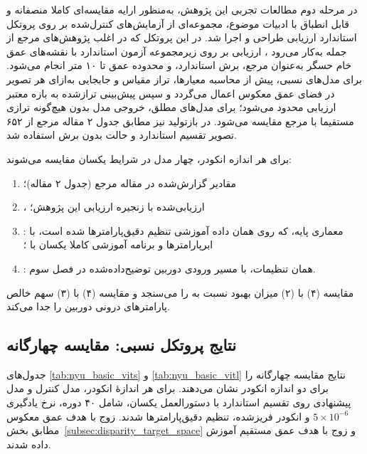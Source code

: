 در مرحله دوم مطالعات تجربی این پژوهش، به‌منظور ارایه مقایسه‌ای کاملا منصفانه و قابل انطباق با ادبیات موضوع، مجموعه‌ای از آزمایش‌های کنترل‌شده بر روی پروتکل استاندارد ارزیابی  طراحی و اجرا شد. در این پروتکل که در اغلب پژوهش‌های مرجع از جمله  به‌کار می‌رود \cite{Eigen2014Depth, DepthAnythingV2}، ارزیابی بر روی زیرمجموعه آزمون استاندارد با نقشه‌های عمق خام حسگر به‌عنوان مرجع، برش استاندارد، و محدوده عمق  تا ۱۰ متر انجام می‌شود. برای مدل‌های نسبی، پیش از محاسبه معیارها، تراز مقیاس و جابجایی به‌ازای هر تصویر در فضای عمق معکوس اعمال می‌گردد و سپس پیش‌بینی تراز‌شده به بازه معتبر ارزیابی محدود می‌شود؛ برای مدل‌های مطلق، خروجی مدل بدون هیچ‌گونه ترازی مستقیما با مرجع مقایسه می‌شود. در بازتولید  نیز مطابق جدول ۲ مقاله مرجع از ۶۵۲ تصویر تقسیم استاندارد و حالت بدون برش استفاده شد.

برای هر اندازه انکودر، چهار مدل در شرایط یکسان مقایسه می‌شوند:
\begin{enumerate}
  \item مقادیر گزارش‌شده در مقاله مرجع  (جدول ۲ مقاله)؛
  \item \publishedbasemodel{}، ارزیابی‌شده با زنجیره ارزیابی این پژوهش؛
  \item \controlmodel{}: معماری پایه، که روی همان داده آموزشی تنظیم دقیق‌پارامترها شده است، با ابرپارامترها و برنامه آموزشی کاملا یکسان با \proposedmodel{}؛
  \item \proposedmodel{}: همان تنظیمات، با مسیر ورودی دوربین توضیح‌داده‌شده در فصل سوم.
\end{enumerate}
مقایسه (۴) با (۲) میزان بهبود نسبت به \publishedbasemodel{} را می‌سنجد و مقایسه (۴) با (۳) سهم خالص پارامترهای درونی دوربین را جدا می‌کند.

\subsection{نتایج پروتکل نسبی: مقایسه چهارگانه}
\label{subsec:basic_protocol_results}

جدول‌های \ref{tab:nyu_basic_vits} و \ref{tab:nyu_basic_vitl} نتایج مقایسه چهارگانه را برای دو اندازه انکودر نشان می‌دهند. برای هر اندازهٔ انکودر، مدل کنترل و مدل پیشنهادی روی تقسیم استاندارد با دستورالعمل یکسان، شامل ۴۰ دوره، نرخ یادگیری $5\times10^{-6}$ و انکودر فریزشده، تنظیم دقیق‌پارامترها شدند. زوج  با هدف عمق معکوس مطابق بخش~\ref{subsec:disparity_target_space} و زوج  با هدف عمق مستقیم آموزش داده شدند.

